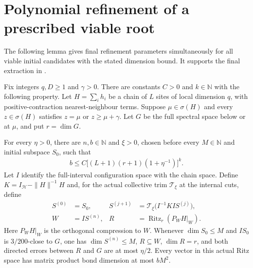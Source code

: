 \section{Polynomial refinement of a prescribed viable root}

The following lemma gives final refinement parameters simultaneously for
all viable initial candidates with the stated dimension bound. It supports
the final extraction in \cite{Arad2016RigorousRG}.

\begin{lemma}
    \label{lem:same_root_polynomial_refinement}
    \leanok
    Fix integers $q,D\ge1$ and $\gamma>0$. There are constants $C>0$ and
    $k\in\mathbb N$ with the following property. Let
    $H=\sum_i h_i$ be a chain of $L$ sites of local dimension $q$, with
    positive-contraction nearest-neighbour terms. Suppose
    $\mu\in\sigma(H)$ and every $z\in\sigma(H)$ satisfies
    $z=\mu$ or $z\ge\mu+\gamma$. Let $G$ be the full spectral space
    below or at $\mu$, and put $r=\dim G$.

    For every $\eta>0$, there are $n,b\in\mathbb N$ and $\xi>0$, chosen
    before every $M\in\mathbb N$ and initial subspace $S_0$, such that
    \begin{align}
        b\le C\bigl[(L+1)(r+1)(1+\eta^{-1})\bigr]^k.
    \end{align}
    Let $I$ identify the full-interval configuration space with the chain
    space. Define $K=I_{\mathcal H}-\|H\|^{-1}H$ and, for the actual
    collective trim $\mathcal T_\xi$ at the internal cuts, define
    \begin{align}
        S^{(0)}   & =S_0,                                         &
        S^{(j+1)} & =\mathcal T_\xi\bigl(I^{-1}K I S^{(j)}\bigr),                                         \\
        W         & =I S^{(n)},                                   & R & =\operatorname{Ritz}_r(P_W H|_W).
    \end{align}
    Here $P_W H|_W$ is the orthogonal compression to $W$.
    Whenever $\dim S_0\le M$ and $I S_0$ is $3/200$-close to $G$,
    one has $\dim S^{(n)}\le M$, $R\subseteq W$, $\dim R=r$, and both
    directed errors between $R$ and $G$ are at most $\eta/2$.
    Every vector in this actual Ritz space has matrix product bond
    dimension at most $bM^2$.
\end{lemma}
